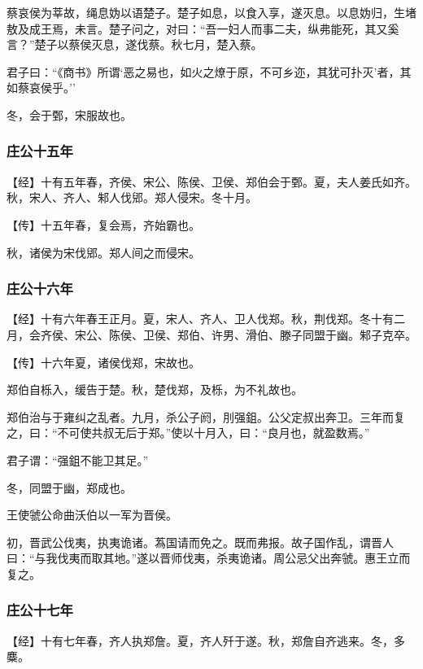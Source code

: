 \documentclass[]{article}
\begin{document}
蔡哀侯为莘故，绳息妫以语楚子。楚子如息，以食入享，遂灭息。以息妫归，生堵敖及成王焉，未言。楚子问之，对曰：``吾一妇人而事二夫，纵弗能死，其又奚言？''楚子以蔡侯灭息，遂伐蔡。秋七月，楚入蔡。

君子曰：``《商书》所谓`恶之易也，如火之燎于原，不可乡迩，其犹可扑灭'者，其如蔡哀侯乎。''

冬，会于鄄，宋服故也。

\hypertarget{header-n466}{%
\subsubsection{庄公十五年}\label{header-n466}}

【经】十有五年春，齐侯、宋公、陈侯、卫侯、郑伯会于鄄。夏，夫人姜氏如齐。秋，宋人、齐人、邾人伐郳。郑人侵宋。冬十月。

【传】十五年春，复会焉，齐始霸也。

秋，诸侯为宋伐郳。郑人间之而侵宋。

\hypertarget{header-n472}{%
\subsubsection{庄公十六年}\label{header-n472}}

【经】十有六年春王正月。夏，宋人、齐人、卫人伐郑。秋，荆伐郑。冬十有二月，会齐侯、宋公、陈侯、卫侯、郑伯、许男、滑伯、滕子同盟于幽。邾子克卒。

【传】十六年夏，诸侯伐郑，宋故也。

郑伯自栎入，缓告于楚。秋，楚伐郑，及栎，为不礼故也。

郑伯治与于雍纠之乱者。九月，杀公子阏，刖强鉏。公父定叔出奔卫。三年而复之，曰：``不可使共叔无后于郑。''使以十月入，曰：``良月也，就盈数焉。''

君子谓：``强鉏不能卫其足。''

冬，同盟于幽，郑成也。

王使虢公命曲沃伯以一军为晋侯。

初，晋武公伐夷，执夷诡诸。蒍国请而免之。既而弗报。故子国作乱，谓晋人曰：``与我伐夷而取其地。''遂以晋师伐夷，杀夷诡诸。周公忌父出奔虢。惠王立而复之。

\hypertarget{header-n483}{%
\subsubsection{庄公十七年}\label{header-n483}}

【经】十有七年春，齐人执郑詹。夏，齐人歼于遂。秋，郑詹自齐逃来。冬，多麋。
\end{document}
